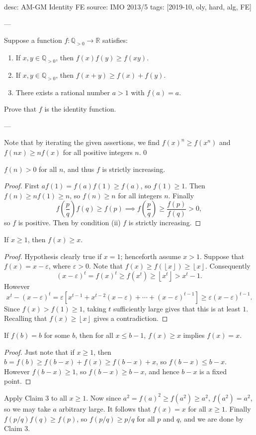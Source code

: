 desc: AM-GM Identity FE
source: IMO 2013/5
tags: [2019-10, oly, hard, alg, FE]

---

Suppose a function $f:\mathbb Q_{>0}\to\mathbb R$ satisfies:
\begin{enumerate}[label=(\roman*),itemsep=0em]
    \item If $x,y\in\mathbb Q_{>0}$, then $f(x)f(y)\ge f(xy)$.
    \item If $x,y\in\mathbb Q_{>0}$, then $f(x+y)\ge f(x)+f(y)$.
    \item There exists a rational number $a>1$ with $f(a)=a$.
\end{enumerate}
Prove that $f$ is the identity function.

---

Note that by iterating the given assertions, we find $f(x)^n\ge f(x^n)$ and $f(nx)\ge nf(x)$ for all positive integers $n$.
\setcounter{iclaim}0
\begin{iclaim}
    $f(n)>0$ for all $n$, and thus $f$ is strictly increasing. 
\end{iclaim}
\begin{proof}
    First $af(1)=f(a)f(1)\ge f(a)$, so $f(1)\ge1$. Then $f(n)\ge nf(1)\ge n$, so $f(n)\ge n$ for all integers $n$. Finally \[f\left(\frac pq\right)f(q)\ge f(p)\implies f\left(\frac pq\right)\ge\frac{f(p)}{f(q)}>0,\]
    so $f$ is positive. Then by condition (ii) $f$ is strictly increasing.
\end{proof}
\begin{iclaim}
    If $x\ge1$, then $f(x)\ge x$.
\end{iclaim}
\begin{proof}
    Hypothesis clearly true if $x=1$; henceforth assume $x>1$. Suppose that $f(x)=x-\varepsilon$, where $\varepsilon>0$. Note that $f(x)\ge f(\left\lfloor x\right\rfloor)\ge\left\lfloor x\right\rfloor$. Consequently \[(x-\varepsilon)^t=f(x)^t\ge f(x^t)\ge\left\lfloor x^t\right\rfloor>x^t-1.\]
    However \[x^t-(x-\varepsilon)^t=\varepsilon\left[x^{t-1}+x^{t-2}(x-\varepsilon)+\cdots+(x-\varepsilon)^{t-1}\right]\ge\varepsilon(x-\varepsilon)^{t-1}.\]
    Since $f(x)>f(1)\ge1$, taking $t$ sufficiently large gives that this is at least $1$. Recalling that $f(x)\ge\left\lfloor x\right\rfloor$ gives a contradiction.
\end{proof}
\begin{iclaim}
    If $f(b)=b$ for some $b$, then for all $x\le b-1$, $f(x)\ge x$ implies $f(x)=x$.
\end{iclaim}
\begin{proof}
    Just note that if $x\ge1$, then $b=f(b)\ge f(b-x)+f(x)\ge f(b-x)+x$, so $f(b-x)\le b-x$. However $f(b-x)\ge1$, so $f(b-x)\ge b-x$, and hence $b-x$ is a fixed point.
\end{proof}

Apply Claim 3 to all $x\ge1$. Now since $a^2=f(a)^2\ge f(a^2)\ge a^2$, $f(a^2)=a^2$, so we may take $a$ arbitrary large. It follows that $f(x)=x$ for all $x\ge1$. Finally $f(p/q)f(q)\ge f(p)$, so $f(p/q)\ge p/q$ for all $p$ and $q$, and we are done by Claim 3.
